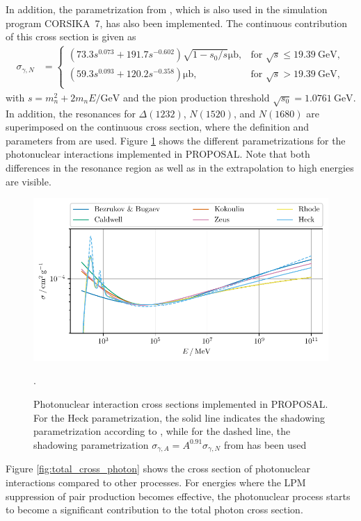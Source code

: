 In addition, the parametrization from \cite{Heck2012CORSIKA}, which is also used in the simulation program CORSIKA~7, has also been implemented.
The continuous contribution of this cross section is given as 
%
\begin{align}
	\label{eqn:photonuclear_C7}
	\sigma_{\gamma,N} &=
	\begin{cases}
		\left(73.3 s^{0.073} + 191.7 s^{-0.602} \right) \sqrt{1 - s_0 / s} \si{\micro\barn}, & \text{for } \sqrt{s} \leq \SI{19.39}{\giga\electronvolt}, \\
		\left( 59.3 s^{0.093} + 120.2 s^{-0.358} \right) \si{\micro\barn}, & \text{for } \sqrt{s} > \SI{19.39}{\giga\electronvolt}, \\
	\end{cases}
\end{align} 
%
with $s = m_n^2 + 2 m_n E / \si{\giga\electronvolt}$ and the pion production threshold $\sqrt{s_0} = \SI{1.0761}{\giga\electronvolt}$.
In addition, the resonances for $\Delta(1232)$, $N(1520)$, and $N(1680)$ are superimposed on the continuous cross section, where the definition and parameters from \cite{Muecke_2000} are used.
Figure \ref{fig:photoproduction_cross} shows the different parametrizations for the photonuclear interactions implemented in PROPOSAL.
Note that both differences in the resonance region as well as in the extrapolation to high energies are visible.
%
\begin{figure}
	\centering
    \includegraphics{plots/photoproduction_cross.pdf}
    \caption{Photonuclear interaction cross sections implemented in PROPOSAL. For the Heck parametrization, the solid line indicates the shadowing parametrization according to \cite{KOEHNE20132070}, while for the dashed line, the shadowing parametrization $\sigma_{\gamma,A} = A^{0.91} \sigma_{\gamma,N}$ from \cite{Heck2012CORSIKA} has been used}.
    \label{fig:photoproduction_cross}
\end{figure}
%
Figure \ref{fig:total_cross_photon} shows the cross section of photonuclear interactions compared to other processes.
For energies where the LPM suppression of pair production becomes effective, the photonuclear process starts to become a significant contribution to the total photon cross section.


